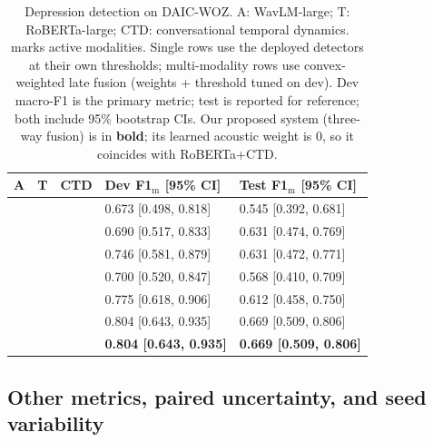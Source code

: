 \documentclass{article}
\newcommand{\yes}{\ding{51}}
\newcommand{\no}{}
\begin{document}
\begin{table}[!t]
\centering
\caption{Depression detection on DAIC-WOZ. A: WavLM-large; T: RoBERTa-large; CTD: conversational temporal dynamics. \yes{} marks active modalities. Single rows use the deployed detectors at their own thresholds; multi-modality rows use convex-weighted late fusion (weights + threshold tuned on dev). Dev macro-F1 is the primary metric; test is reported for reference; both include 95\% bootstrap CIs. Our proposed system (three-way fusion) is in \textbf{bold}; its learned acoustic weight is 0, so it coincides with RoBERTa+CTD.}
\label{tab:results}
\begin{tabular}{ccc l l}
\toprule
A & T & CTD & Dev F1$_{\text{m}}$ [95\% CI] & Test F1$_{\text{m}}$ [95\% CI] \\
\midrule
\yes & \no  & \no  & 0.673 [0.498, 0.818] & 0.545 [0.392, 0.681] \\
\no  & \yes & \no  & 0.690 [0.517, 0.833] & 0.631 [0.474, 0.769] \\
\no  & \no  & \yes & 0.746 [0.581, 0.879] & 0.631 [0.472, 0.771] \\
\midrule
\yes & \yes & \no  & 0.700 [0.520, 0.847] & 0.568 [0.410, 0.709] \\
\yes & \no  & \yes & 0.775 [0.618, 0.906] & 0.612 [0.458, 0.750] \\
\no  & \yes & \yes & 0.804 [0.643, 0.935] & 0.669 [0.509, 0.806] \\
\midrule
\textbf{\yes} & \textbf{\yes} & \textbf{\yes} & \textbf{0.804 [0.643, 0.935]} & \textbf{0.669 [0.509, 0.806]} \\
\bottomrule
\end{tabular}
\vspace{-4mm}
\end{table}



\subsection{Other metrics, paired uncertainty, and seed variability} 
\end{document}
